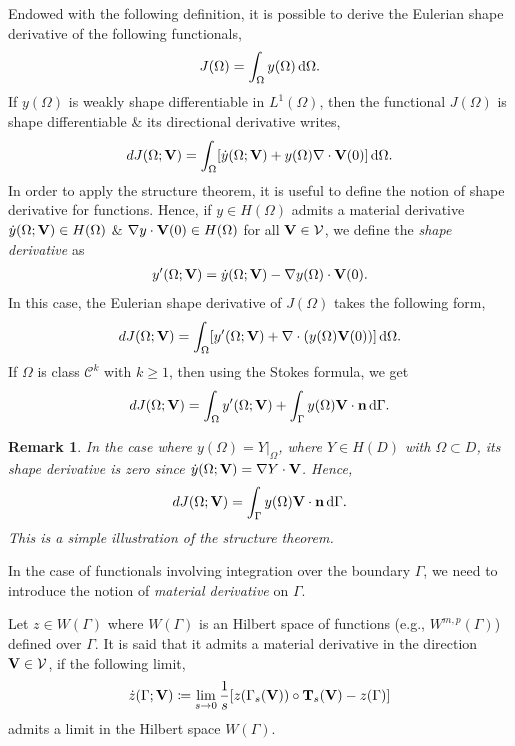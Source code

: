 \documentclass[oneside]{book}
\numberwithin{equation}{section}
\newtheorem{remark}{Remark}[chapter]
\begin{document}
Endowed with the following definition, it is possible to derive the Eulerian shape derivative of the following functionals,
\begin{align*}
	J(\Omega) = \int_\Omega y(\Omega)\,{\rm d}\Omega.
\end{align*}
If $y(\Omega)$ is weakly shape differentiable in $L^1(\Omega)$, then the functional $J(\Omega)$ is shape differentiable \& its directional derivative writes,
\begin{align*}
	dJ(\Omega;{\bf V}) = \int_\Omega [\dot{y}(\Omega;{\bf V}) + y(\Omega)\nabla\cdot{\bf V}(0)]\,{\rm d}\Omega.
\end{align*}
In order to apply the structure theorem, it is useful to define the notion of shape derivative for functions. Hence, if $y\in H(\Omega)$ admits a material derivative $\dot{y}(\Omega;{\bf V})\in H(\Omega)$ \& $\nabla y\cdot{\bf V}(0)\in H(\Omega)$ for all ${\bf V}\in\mathcal{V}$, we define the \textit{shape derivative} as
\begin{align*}
	y'(\Omega;{\bf V}) = \dot{y}(\Omega;{\bf V}) - \nabla y(\Omega)\cdot{\bf V}(0).
\end{align*}
In this case, the Eulerian shape derivative of $J(\Omega)$ takes the following form,
\begin{align*}
	dJ(\Omega;{\bf V}) = \int_\Omega [y'(\Omega;{\bf V}) + \nabla\cdot(y(\Omega){\bf V}(0))]\,{\rm d}\Omega.
\end{align*}
If $\Omega$ is class $\mathcal{C}^k$ with $k\ge 1$, then using the Stokes formula, we get
\begin{align*}
	dJ(\Omega;{\bf V}) = \int_\Omega y'(\Omega;{\bf V}) + \int_\Gamma y(\Omega){\bf V}\cdot{\bf n}\,{\rm d}\Gamma.
\end{align*}

\begin{remark}
	In the case where $y(\Omega) = Y|_\Omega$, where $Y\in H(D)$ with $\Omega\subset D$, its shape derivative is zero since $\dot{y}(\Omega;{\bf V}) = \nabla Y\cdot{\bf V}$. Hence,
	\begin{align*}
		dJ(\Omega;{\bf V}) = \int_\Gamma y(\Omega){\bf V}\cdot{\bf n}\,{\rm d}\Gamma.
	\end{align*}
	This is a simple illustration of the structure theorem.
\end{remark}
In the case of functionals involving integration over the boundary $\Gamma$, we need to introduce the notion of \textit{material derivative} on $\Gamma$.

Let $z\in W(\Gamma)$ where $W(\Gamma)$ is an Hilbert space of functions (e.g., $W^{m,p}(\Gamma)$) defined over $\Gamma$. It is said that it admits a material derivative in the direction ${\bf V}\in\mathcal{V}$, if the following limit,
\begin{align*}
	\dot{z}(\Gamma;{\bf V})\coloneqq\lim_{s\to 0} \frac{1}{s}[z(\Gamma_s({\bf V}))\circ{\bf T}_s({\bf V}) - z(\Gamma)]
\end{align*}
admits a limit in the Hilbert space $W(\Gamma)$.
\end{document}
